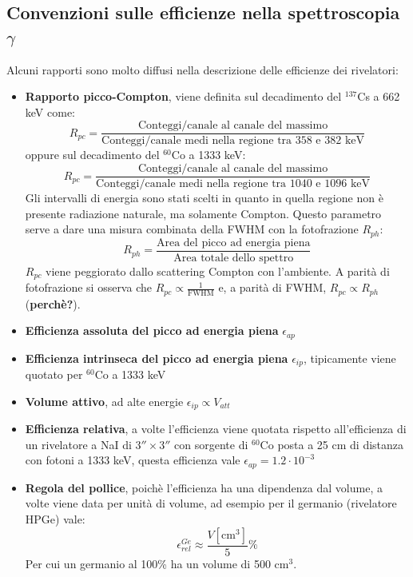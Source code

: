 \subsection{Convenzioni sulle efficienze nella spettroscopia $\gamma$}
Alcuni rapporti sono molto diffusi nella descrizione delle efficienze dei rivelatori:
\begin{itemize}
\item \textbf{Rapporto picco-Compton}, viene definita sul decadimento del $^{137}$Cs  a 662 keV come:
\begin{equation*}
R_{pc} = \frac{\text{Conteggi/canale al canale del massimo}}{\text{Conteggi/canale medi nella regione tra 358 e 382 keV}}
\end{equation*}
oppure sul decadimento del $^{60}$Co a 1333 keV:
\begin{equation*}
R_{pc} = \frac{\text{Conteggi/canale al canale del massimo}}{\text{Conteggi/canale medi nella regione tra 1040 e 1096 keV}}
\end{equation*}
Gli intervalli di energia sono stati scelti in quanto in quella regione non \`e presente radiazione naturale, ma solamente Compton.
Questo parametro serve a dare una misura combinata della FWHM con la fotofrazione $R_{ph}$:
\begin{equation*}
R_{ph} = \frac{\text{Area del picco ad energia piena}}{\text{Area totale dello spettro}}
\end{equation*}
$R_{pc}$ viene peggiorato dallo scattering Compton con l'ambiente.
A parit\`a di fotofrazione si osserva che $R_{pc} \propto \frac{1}{\text{FWHM}}$ e, a parit\`a di FWHM, $R_{pc} \propto R_{ph}$ (\textbf{perch\`e?}).
\item \textbf{Efficienza assoluta del picco ad energia piena} $\epsilon_{ap}$
\item \textbf{Efficienza intrinseca del picco ad energia piena} $\epsilon_{ip}$, tipicamente viene quotato per $^60$Co a 1333 keV
\item \textbf{Volume attivo}, ad alte energie $\epsilon_{ip} \propto V_{att}$
\item \textbf{Efficienza relativa}, a volte l'efficienza viene quotata rispetto all'efficienza di un rivelatore a NaI di $3''\times 3''$ 
con sorgente di $^{60}$Co posta a 25 cm di distanza con fotoni a 1333 keV, questa efficienza vale $\epsilon_{ap} = 1.2 \cdot 10^{-3}$
\item \textbf{Regola del pollice}, poich\`e l'efficienza ha una dipendenza dal volume, a volte viene data per unit\`a di volume, ad esempio per il germanio (rivelatore HPGe) vale:
\begin{equation*}
\epsilon_{rel}^{Ge} \approx \frac{V[\text{cm}^3]}{5}\%
\end{equation*}
Per cui un germanio al 100\% ha un volume di 500 cm$^3$.
\end{itemize}